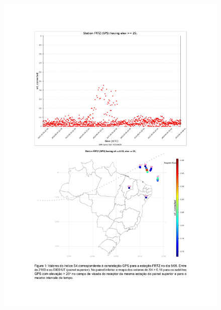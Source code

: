 \documentclass[a4paper, 10pt]{article}
\begin{document}
    \begin{figure}[H]
        \centering
        \includegraphics[width=14cm]{./figures/en_outfileScint_0.jpg}
    \end{figure} 
 
\end{document}
